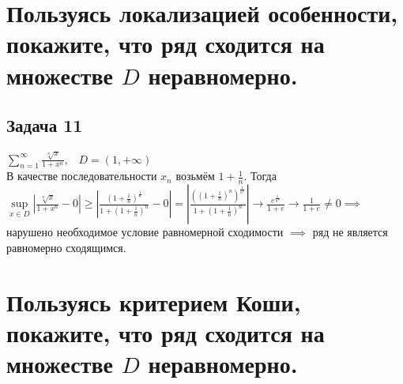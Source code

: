 \documentclass[a4paper, fleqn]{article}
\begin{document}
    
    
    \section*{Пользуясь локализацией особенности, покажите, что ряд сходится на множестве $D$ неравномерно.}
    \subsection*{Задача 11}
    $\sum\limits_{n = 1}^{\infty} \frac{\sqrt[n]{x}}{1 + x^n}, \; \; \; D = (1, +\infty)$ \\
    В качестве последовательности $x_n$ возьмём $1 + \frac{1}{n}$. Тогда \\
    $\sup\limits_{x \in D} \left| \frac{\sqrt[n]{x}}{1 + x^n} - 0 \right| \geq \left| \frac{(1 + \frac{1}{n})^{\frac{1}{n}}}{1 + (1 + \frac{1}{n})^n} - 0 \right| = \left| \frac{((1 + \frac{1}{n})^n)^{\frac{1}{n^2}}}{1 + (1 + \frac{1}{n})^n} \right| \rightarrow \frac{e^{\frac{1}{n^2}}}{1 + e} \rightarrow \frac{1}{1 + e} \neq 0 \implies$ нарушено необходимое условие равномерной сходимости $\implies$ ряд не является равномерно сходящимся. \\

    
    
    
    
    \section*{Пользуясь критерием Коши, покажите, что ряд сходится на множестве $D$ неравномерно.}
\end{document}
